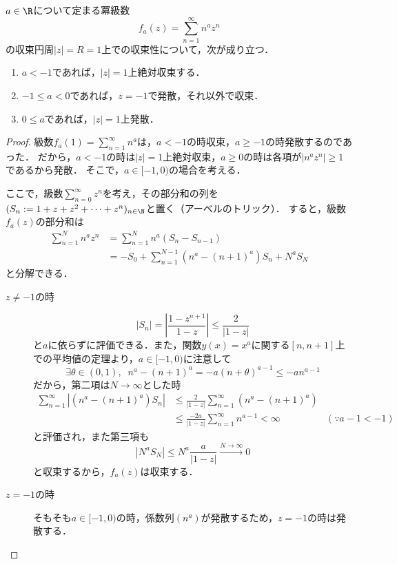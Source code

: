 \documentclass[uplatex, dvipdfmx]{jsreport}
\begin{document}
\begin{example}
    $a\in\R$について定まる冪級数
    \[ f_a(z)=\sum^\infty_{n=1}n^az^n \]
    の収束円周$|z|=R=1$上での収束性について，次が成り立つ．
    \begin{enumerate}
        \item $a<-1$であれば，$|z|=1$上絶対収束する．
        \item $-1\le a<0$であれば，$z=-1$で発散，それ以外で収束．
        \item $0\le a$であれば，$|z|=1$上発散．
    \end{enumerate}
\end{example}
\begin{proof}
    級数$f_a(1)=\sum^\infty_{n=1}n^a$は，$a<-1$の時収束，$a\ge -1$の時発散するのであった．
    だから，$a<-1$の時は$|z|=1$上絶対収束，$a\ge 0$の時は各項が$|n^az^n|\ge 1$であるから発散．
    そこで，$a\in[-1,0)$の場合を考える．

    ここで，級数$\sum^\infty_{n=0}z^n$を考え，その部分和の列を$(S_n:=1+z+z^2+\cdots+z^n)_{n\in\N}$と置く（アーベルのトリック）．
    すると，級数$f_a(z)$の部分和は
    \begin{align*}
        \sum^N_{n=1}n^az^n&=\sum^N_{n=1}n^a(S_n-S_{n-1})\\
        &= -S_0+\sum^{N-1}_{n=1}(n^a-(n+1)^a)S_n+N^aS_N
    \end{align*}
    と分解できる．
    \begin{description}
        \item[$z\ne -1$の時] \[ |S_n|=\left|\frac{1-z^{n+1}}{1-z}\right|\le\frac{2}{|1-z|} \]
        と$a$に依らずに評価できる．また，関数$y(x)=x^a$に関する$[n,n+1]$上での平均値の定理より，$a\in[-1,0)$に注意して
        \[\exists\theta\in(0,1),\;\;n^a-(n+1)^a=-a(n+\theta)^{a-1}\le -an^{a-1}\]
        だから，第二項は$N\to\infty$とした時
        \begin{align*}
            \sum^\infty_{n=1}\left|(n^a-(n+1)^a)S_n\right|&\le\frac{2}{|1-z|}\sum^\infty_{n=1}(n^a-(n+1)^a)\\
            &\le\frac{-2a}{|1-z|}\sum^\infty_{n=1}n^{a-1}<\infty&(\because a-1<-1)
        \end{align*}
        と評価され，また第三項も
        \[ |N^aS_N|\le N^a\frac{a}{|1-z|}\xrightarrow{N\to\infty}0 \]
        と収束するから，$f_a(z)$は収束する．
        \item[$z=-1$の時] そもそも$a\in[-1,0)$の時，係数列$(n^a)$が発散するため，$z=-1$の時は発散する．
    \end{description}
\end{proof}
\end{document}

